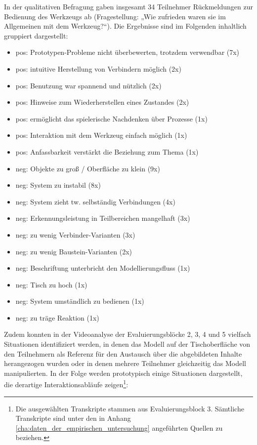 In der qualitativen Befragung gaben insgesamt 34 Teilnehmer Rückmeldungen zur Bedienung des Werkzeugs ab (Fragestellung: „Wie zufrieden waren sie im Allgemeinen mit dem Werkzeug?“). Die Ergebnisse sind im Folgenden inhaltlich gruppiert dargestellt:

\begin{itemize}
 \item pos: Prototypen-Probleme nicht überbewerten, trotzdem verwendbar (7x)
 \item pos: intuitive Herstellung von Verbindern möglich (2x)
 \item pos: Benutzung war spannend und nützlich (2x)
 \item pos: Hinweise zum Wiederherstellen eines Zustandes (2x)
 \item pos: ermöglicht das spielerische Nachdenken über Prozesse (1x)
 \item pos: Interaktion mit dem Werkzeug einfach möglich (1x)
 \item pos: Anfassbarkeit verstärkt die Beziehung zum Thema (1x)
 \item neg: Objekte zu groß / Oberfläche zu klein (9x)
 \item neg: System zu instabil (8x)
 \item neg: System zieht tw. selbständig Verbindungen (4x)
 \item neg: Erkennungsleistung in Teilbereichen mangelhaft (3x)
 \item neg: zu wenig Verbinder-Varianten (3x)
 \item neg: zu wenig Baustein-Varianten (2x)
 \item neg: Beschriftung unterbricht den Modellierungsfluss (1x)
 \item neg: Tisch zu hoch (1x)
 \item neg: System umständlich zu bedienen (1x)
 \item neg: zu träge Reaktion (1x)
\end{itemize}

Zudem konnten in der Videoanalyse der Evaluierungsblöcke 2, 3, 4 und 5 vielfach Situationen identifiziert werden, in denen das Modell auf der Tischoberfläche von den Teilnehmern als Referenz für den Austausch über die abgebildeten Inhalte herangezogen wurden oder in denen mehrere Teilnehmer gleichzeitig das Modell manipulierten. In der Folge werden prototypisch einige Situationen dargestellt, die derartige Interaktionsabläufe zeigen\footnote{Die ausgewählten Transkripte stammen aus Evaluierungsblock 3. Sämtliche Transkripte sind unter den in Anhang \ref{cha:daten_der_empirischen_untersuchung} angeführten Quellen zu beziehen.}:



